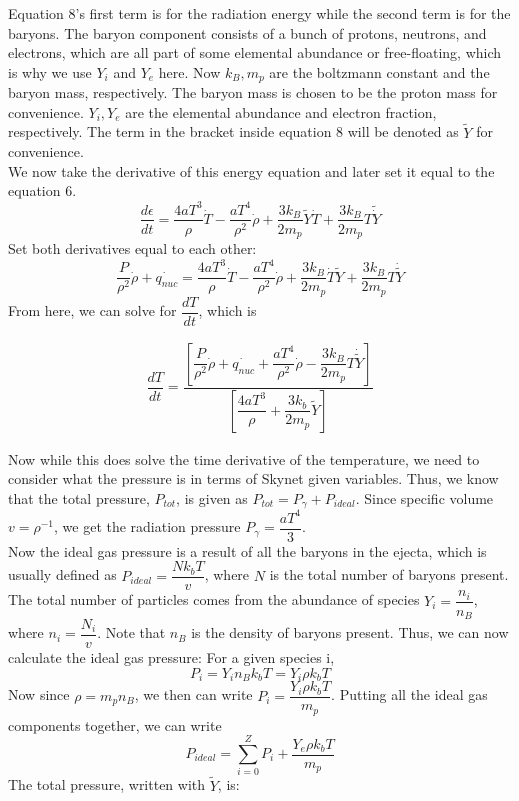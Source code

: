 \documentclass[11pt,a4paper]{article}
\begin{document}
Equation 8's first term is for the radiation energy while the second term is for the baryons. The baryon component consists of a bunch of protons, neutrons, and electrons, which are all part of some elemental abundance or free-floating, which is why we use $Y_i$ and $Y_e$ here. Now $k_B, m_p$ are the boltzmann constant and the baryon mass, respectively. The baryon mass is chosen to be the proton mass for convenience. $Y_i, Y_e$ are the elemental abundance and electron fraction, respectively. The term in the bracket inside equation 8 will be denoted as $\tilde{Y}$ for convenience.\\
We now take the derivative of this energy equation and later set it equal to the equation 6.
$$ \dfrac{d \epsilon}{dt} = \dfrac{4a T^3}{\rho}\dot{T} - \dfrac{a T^4}{\rho^2} \dot{\rho} + \dfrac{3 k_B}{2 m_p} \tilde{Y} \dot{T} + \dfrac{3 k_B}{2 m_p} T \tilde{\dot{Y}} $$ Set both derivatives equal to each other:
$$ \dfrac{P}{\rho^2} \dot{\rho} + \dot{q_{nuc}} = \dfrac{4a T^3}{\rho} \dot{T} -  \dfrac{aT^4}{\rho^2} \dot{\rho} + \dfrac{3 k_B}{2 m_p} \dot{T} \tilde{Y} + \dfrac{3 k_B}{2 m_p} T \dot{\tilde{Y}} $$ From here, we can solve for $\dfrac{dT}{dt}$, which is 

\begin{align}
	\dfrac{dT}{dt} = \dfrac{[ \dfrac{P}{\rho^2} \dot{\rho} + \dot{q_{nuc}} + \dfrac{aT^4}{\rho^2} \dot{\rho} - \dfrac{3 k_B}{2 m_p} T \dot{\tilde{Y}}]} {[\dfrac{4a T^3}{\rho} + \dfrac{3 k_b}{2 m_p} \tilde{Y}]}
\end{align}

Now while this does solve the time derivative of the temperature, we need to consider what the pressure is in terms of Skynet given variables. Thus, we know that the total pressure, $P_{tot}$, is given as $P_{tot} = P_{\gamma} + P_{ideal}$. Since specific volume $v = \rho ^{-1}$, we get the radiation pressure $P_{\gamma} = \dfrac{a T^4}{3}$.\\
Now the ideal gas pressure is a result of all the baryons in the ejecta, which is usually defined as $P_{ideal} = \dfrac{N k_b T}{v}$, where $N$ is the total number of baryons present. The total number of particles comes from the abundance of species $Y_i = \dfrac{n_i}{n_B}$, where $n_i = \dfrac{N_i}{v}$. Note that $n_B$ is the density of baryons present. Thus, we can now calculate the ideal gas pressure: For a given species i,
$$ P_i = Y_i n_B k_b T  = Y_i \rho k_b T$$ Now since $\rho = m_p n_B$, we then can write $P_i = \dfrac{Y_i \rho k_b T}{m_p}$. Putting all the ideal gas components together, we can write 
$$ P_{ideal} = \sum_{i=0}^{Z} P_i + \dfrac{Y_e \rho k_b T}{m_p} $$ The total pressure, written with $\tilde{Y}$, is:
\end{document}
